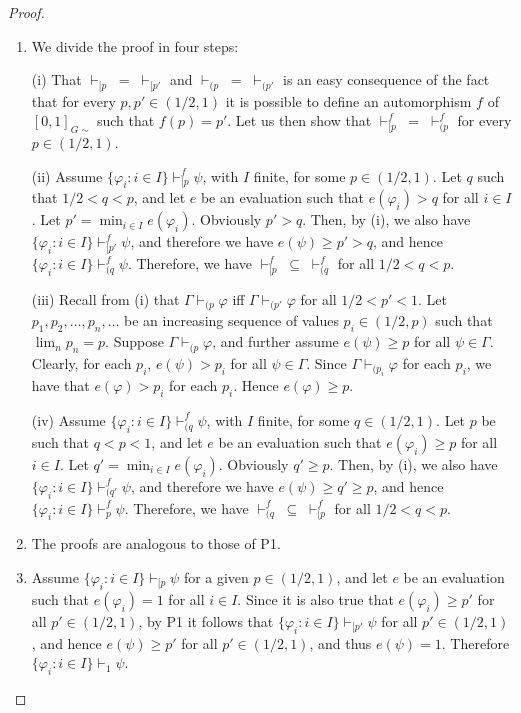 \documentclass[10pt,a4paper]{amsart}
\begin{document}
\begin{proof}  \mbox{}

\begin{enumerate}
\item[P1.]  We divide the proof in four steps:

(i) That $\vdash_{[p} \; = \; \vdash_{[p'}$ and $\vdash_{(p} \; = \; \vdash_{(p'}$ is an easy consequence of the fact that for every $p, p' \in (1/2,1)$  it is possible to define an automorphism $f$ of $[0,1]_{G\sim}$ such that $f(p) = p'$. Let us then show that  $\vdash^f_{[p} \; =\;  \vdash^f_{(p}$ for every $p \in (1/2, 1)$.

(ii) Assume $\{\varphi_i : i \in I\} \vdash^f_{[p} \psi$, with $I$ finite, for some $p \in (1/2, 1)$. Let $q$ such that $1/2 < q < p$, and let $e$ be an evaluation such that $e(\varphi_i) > q $ for all $i \in I$. 
Let $p' = \min_{i \in I} e(\varphi_i)$. Obviously $p' > q$. Then, by (i), we also have $\{\varphi_i : i \in I\} \vdash^f_{[p'} \psi$, and therefore we have $e(\psi) \geq p' > q$, and hence $\{\varphi_i :  i \in I\} \vdash^f_{(q} \psi$. Therefore, we have $\vdash^f_{[p}  \; \subseteq  \; \vdash^f_{(q}$ for all $1/2 < q < p$.

(iii) Recall from (i) that $\Gamma \vdash_{(p} \varphi$ iff $\Gamma \vdash_{(p'} \varphi$ for all $1/2 < p' < 1$. Let $p_1, p_2, \ldots, p_n, \ldots $ be an increasing sequence of values $p_i \in (1/2, p)$ such that $\lim_n p_n = p$. 
%
Suppose $\Gamma \vdash_{(p} \varphi$, and further assume $e(\psi) \geq p$ for all $\psi \in \Gamma$. Clearly, for each $p_i$, $e(\psi) > p_i$ for all $\psi \in \Gamma$. Since $\Gamma \vdash_{(p_i} \varphi$ for each $p_i$, we have that $e(\varphi) > p_i$ for each $p_i$.  Hence $e(\varphi) \geq p$. 

(iv) Assume $\{\varphi_i :  i \in I\} \vdash^f_{(q} \psi$, with $I$ finite, for some $q \in (1/2, 1)$. Let $p$ be such that $ q < p < 1$, and let $e$ be an evaluation such that $e(\varphi_i) \geq p $ for all $i \in I$. 
Let $q' = \min_{i \in I} e(\varphi_i)$. Obviously $q' \geq p$. Then, by (i), we also have $\{\varphi_i :  i \in I\} \vdash^f_{(q'} \psi$, and therefore we have $e(\psi) \geq q' \geq p$, and hence $\{\varphi_i :  i \in I\} \vdash^f_{p} \psi$. Therefore, we have $\vdash^f_{(q}  \; \subseteq  \; \vdash^f_{[p}$ for all $1/2 < q < p$.

\item[P2.] The proofs are analogous to those of P1.

\item[P3.] Assume $\{\varphi_i :  i \in I\} \vdash_{[p} \psi$ for a given $p  \in (1/2,1)$, and let $e$ be an evaluation such that $e(\varphi_i) = 1$ for all $i \in I$. Since it is also true that $e(\varphi_i) \geq p'$ for all $p'  \in (1/2,1)$, by P1 it follows that $\{\varphi_i :  i \in I\} \vdash_{[p'} \psi$ for all $p'  \in (1/2,1)$, and hence $e(\psi) \geq p'$ for all $p'  \in (1/2,1)$, and thus $e(\psi) = 1$. Therefore $\{\varphi_i :  i \in I\} \vdash_1 \psi$.


\end{enumerate}
\end{proof}
\end{document}
